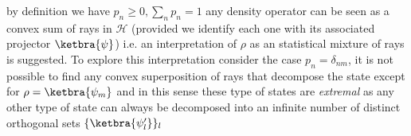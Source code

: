 by definition we have $p_{n}\geq 0, \sum_{n}p_{n}=1$  any density operator can be seen as a convex sum of rays in $\mathcal{H}$ (provided we
identify each one with its associated projector $\ketbra{\psi}$) i.e. an interpretation of $\rho$ as an statistical mixture of rays is suggested.
To explore this interpretation consider the case $p_{n}=\delta_{nm}$, it is not possible to find any
convex superposition of rays that decompose the state except for $\rho=\ketbra{\psi_{m}}$ and in this sense these type of states are
\textit{extremal} \cite{ballentine2014quantum} as any other type of state can always be decomposed into an infinite number of distinct
orthogonal sets $\{\ketbra{\psi_{l}'}\}_{l}$ \cite{nielsen_quantum_2010, reyes}

